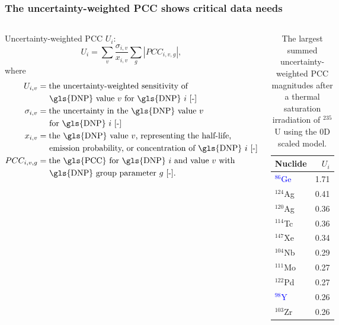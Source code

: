 \begin{frame}
  \frametitle{The uncertainty-weighted \gls{PCC} shows critical data needs}
  \begin{columns}
    \begin{block}{Uncertainty-weighted PCC $U_i$: }
    \begin{equation}
    U_{i} = \sum_v \frac{\sigma_{i,v}}{x_{i,v}} \sum_g\left|PCC_{i,v,g}\right|,
    \label{eq:Uiv}
\end{equation}
where
\begin{align}
    U_{i,v} &= \text{the uncertainty-weighted sensitivity of }\nonumber \\
    & \text{\;\;\;\;\;\gls{DNP} value $v$ for \gls{DNP} $i$ [-]} \nonumber \\
    \sigma_{i,v} &= \text{the uncertainty in the \gls{DNP} value $v$}\nonumber \\
    & \text{\;\;\;\;\;for \gls{DNP} $i$ [-]} \nonumber \\
    x_{i,v} &= \text{the \gls{DNP} value $v$, representing the half-life,}\nonumber \\
    & \text{\;\;\;\;\;emission probability, or concentration of \gls{DNP} $i$ [-]} \nonumber \\
    PCC_{i, v, g} &= \text{the \gls{PCC} for \gls{DNP} $i$ and value $v$ with}\nonumber \\
    & \text{\;\;\;\;\;\gls{DNP} group parameter $g$ [-].} \nonumber
\end{align}
\end{block}
    \begin{table}[!ht]
    \centering
    \caption{The largest summed uncertainty-weighted \gls{PCC} magnitudes after a thermal saturation irradiation of $^{235}$U using the 0D scaled model.}
\begin{tabular}{lr}
\hline
Nuclide &  $U_{i}$ \\
\hline
\textcolor{blue}{$^{86}$Ge} & 1.71 \\
$^{124}$Ag & 0.41 \\
$^{120}$Ag & 0.36 \\
$^{114}$Tc & 0.36 \\
$^{147}$Xe & 0.34 \\
$^{104}$Nb & 0.29 \\
$^{111}$Mo & 0.27 \\
$^{122}$Pd & 0.27 \\
\textcolor{blue}{$^{98}$Y} & 0.26 \\
$^{103}$Zr & 0.26 \\
\hline
\end{tabular}
\label{tab:pcc-summed}
\end{table}
  \end{columns}

\end{frame}

